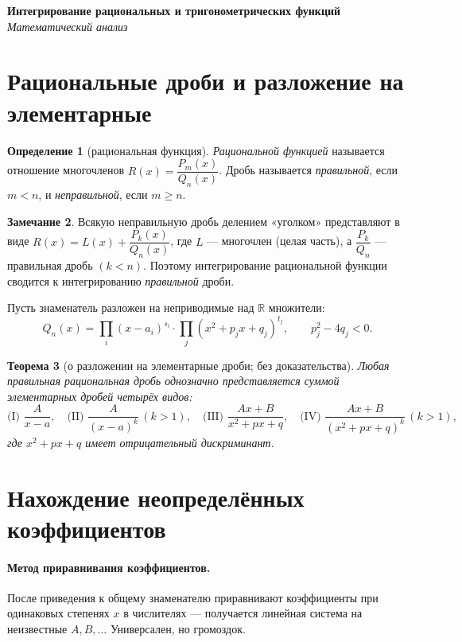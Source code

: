 \documentclass[11pt,a4paper]{article}
\newcommand{\coursename}{Математический анализ}
\newcommand{\doctitle}{Интегрирование рациональных и тригонометрических функций}
\theoremstyle{definition}
\newtheorem{definition}{Определение}[section]
\newtheorem{remark}[definition]{Замечание}
\theoremstyle{plain}
\newtheorem{theorem}[definition]{Теорема}
\newcommand{\R}{\mathbb{R}}
\renewcommand{\ge}{\geqslant}
\begin{document}
\begin{center}
  {\LARGE\bfseries \doctitle}\\[4pt]
  {\large\itshape \coursename}
\end{center}
\vspace{6pt}

\section{Рациональные дроби и разложение на элементарные}

\begin{definition}[рациональная функция]
\emph{Рациональной функцией} называется отношение многочленов $R(x)=\dfrac{P_m(x)}{Q_n(x)}$. Дробь
называется \emph{правильной}, если $m<n$, и \emph{неправильной}, если $m\ge n$.
\end{definition}

\begin{remark}
Всякую неправильную дробь делением «уголком» представляют в виде
$R(x)=L(x)+\dfrac{P_k(x)}{Q_n(x)}$, где $L$ — многочлен (целая часть), а $\dfrac{P_k}{Q_n}$ —
правильная дробь $(k<n)$. Поэтому интегрирование рациональной функции сводится к интегрированию
\emph{правильной} дроби.
\end{remark}

Пусть знаменатель разложен на неприводимые над $\R$ множители:
\[
  Q_n(x)=\prod_i (x-a_i)^{s_i}\cdot\prod_j (x^2+p_j x+q_j)^{t_j},\qquad p_j^2-4q_j<0 .
\]

\begin{theorem}[о разложении на элементарные дроби; без доказательства]
Любая правильная рациональная дробь однозначно представляется суммой элементарных дробей
четырёх видов:
\[
  \text{(I) }\frac{A}{x-a},\quad
  \text{(II) }\frac{A}{(x-a)^k}\,(k>1),\quad
  \text{(III) }\frac{Ax+B}{x^2+px+q},\quad
  \text{(IV) }\frac{Ax+B}{(x^2+px+q)^k}\,(k>1),
\]
где $x^2+px+q$ имеет отрицательный дискриминант.
\end{theorem}

\section{Нахождение неопределённых коэффициентов}

\paragraph{Метод приравнивания коэффициентов.} После приведения к общему знаменателю
приравнивают коэффициенты при одинаковых степенях $x$ в числителях — получается линейная система
на неизвестные $A,B,\dots$ Универсален, но громоздок.
\end{document}
